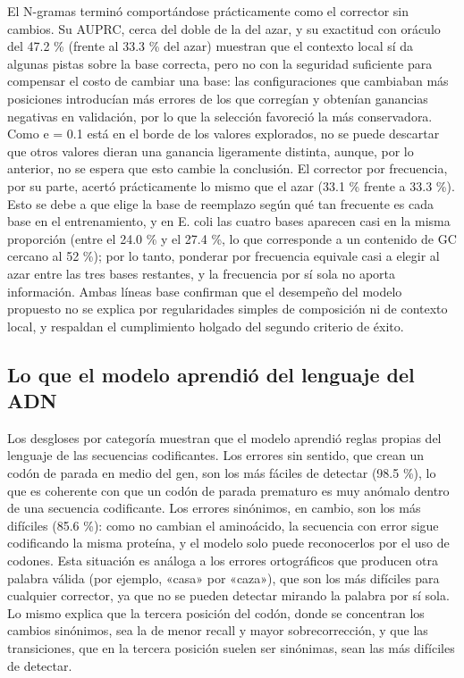 \documentclass[sigconf,nonacm]{acmart}
\begin{document}
El N-gramas terminó comportándose prácticamente como el corrector sin cambios. Su AUPRC, cerca del doble de la del azar, y su exactitud con oráculo del 47.2 \% (frente al 33.3 \% del azar) muestran que el contexto local sí da algunas pistas sobre la base correcta, pero no con la seguridad suficiente para compensar el costo de cambiar una base: las configuraciones que cambiaban más posiciones introducían más errores de los que corregían y obtenían ganancias negativas en validación, por lo que la selección favoreció la más conservadora. Como e = 0.1 está en el borde de los valores explorados, no se puede descartar que otros valores dieran una ganancia ligeramente distinta, aunque, por lo anterior, no se espera que esto cambie la conclusión. El corrector por frecuencia, por su parte, acertó prácticamente lo mismo que el azar (33.1 \% frente a 33.3 \%). Esto se debe a que elige la base de reemplazo según qué tan frecuente es cada base en el entrenamiento, y en E. coli las cuatro bases aparecen casi en la misma proporción (entre el 24.0 \% y el 27.4 \%, lo que corresponde a un contenido de GC cercano al 52 \%); por lo tanto, ponderar por frecuencia equivale casi a elegir al azar entre las tres bases restantes, y la frecuencia por sí sola no aporta información. Ambas líneas base confirman que el desempeño del modelo propuesto no se explica por regularidades simples de composición ni de contexto local, y respaldan el cumplimiento holgado del segundo criterio de éxito.

\subsection{Lo que el modelo aprendió del lenguaje del ADN}\label{sec:disc-lenguaje}

Los desgloses por categoría muestran que el modelo aprendió reglas propias del lenguaje de las secuencias codificantes. Los errores sin sentido, que crean un codón de parada en medio del gen, son los más fáciles de detectar (98.5 \%), lo que es coherente con que un codón de parada prematuro es muy anómalo dentro de una secuencia codificante. Los errores sinónimos, en cambio, son los más difíciles (85.6 \%): como no cambian el aminoácido, la secuencia con error sigue codificando la misma proteína, y el modelo solo puede reconocerlos por el uso de codones. Esta situación es análoga a los errores ortográficos que producen otra palabra válida (por ejemplo, «casa» por «caza»), que son los más difíciles para cualquier corrector, ya que no se pueden detectar mirando la palabra por sí sola. Lo mismo explica que la tercera posición del codón, donde se concentran los cambios sinónimos, sea la de menor recall y mayor sobrecorrección, y que las transiciones, que en la tercera posición suelen ser sinónimas, sean las más difíciles de detectar.
\end{document}
